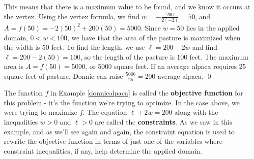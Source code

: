 \begin{ex}
\medskip

This means that there is a maximum value to be found, and we know it occurs at the vertex.  Using the vertex formula, we find $w = -\frac{200}{2(-2)} = 50$, and $A = f(50) = -2(50)^2 + 200(50) = 5000$.  Since $w=50$ lies in the applied domain, $0 < w < 100$, we have that the area of the pasture is maximized when the width is $50$ feet.  To find the length, we use $\ell = 200-2w$ and find $ \ell = 200-2(50) = 100$, so the length of the pasture is $100$ feet.  The maximum area is $A =f(50) = 5000$, or $5000$ square feet.  If an average alpaca requires 25 square feet of pasture, Donnie can raise $\frac{5000}{25} = 200$ average alpaca. \qed

\end{ex}

The function $f$ in Example \ref{donniealpaca} is called the \textbf{objective function} for this problem - it's the function we're trying to optimize.  In the case above, we were trying to maximize $f$. The equation  $\ell+2w = 200$ along with the inequalities $w>0$ and $\ell >0$ are called the \textbf{constraints}.   As we saw in this example, and as we'll see again and again, the constraint equation is used to rewrite the objective function in terms of just one of the variables where constraint inequalities, if any, help determine the applied domain.

